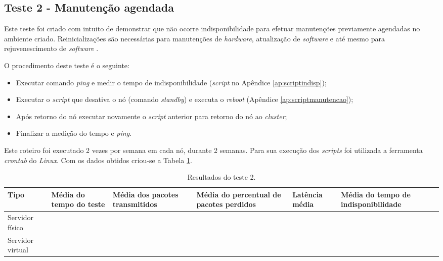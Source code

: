 \subsection{Teste 2 - Manutenção agendada}

Este teste foi criado com intuito de demonstrar que não ocorre indisponibilidade para efetuar manutenções previamente agendadas no ambiente criado.
Reinicializações são necessárias para manutenções de \textit{hardware}, atualização de \textit{software} e até mesmo para rejuvenescimento de
\textit{software} \cite{melo2014}.

O procedimento deste teste é o seguinte:
\begin{itemize}
 \item Executar comando \textit{ping} e medir o tempo de indisponibilidade (\textit{script} no Apêndice \ref{ap:scriptindisp});
 \item Executar o \textit{script} que desativa o nó (comando \textit{standby}) e executa o \textit{reboot} (Apêndice \ref{ap:scriptmanutencao});
 \item Após retorno do nó executar novamente o \textit{script} anterior para retorno do nó ao \textit{cluster};
 \item Finalizar a medição do tempo e \textit{ping}.
\end{itemize}

Este roteiro foi executado 2 vezes por semana em cada nó, durante 2 semanas. Para sua execução dos \textit{scripts} foi utilizada a ferramenta 
\textit{crontab} do \textit{Linux}. Com os dados obtidos criou-se a Tabela \ref{tab:teste2resultados}.

\begin{table}[h!]
\caption{Resultados do teste 2.}
\label{tab:teste2resultados}
\begin{center}
\begin{tabular}{|l|p{2.5cm}|p{2.5cm}|p{2.5cm}|p{2.5cm}|p{3cm}|}\hline
\textbf{Tipo} & \textbf{Média do tempo do teste} & \textbf{Média dos pacotes transmitidos} & \textbf{Média do percentual de pacotes perdidos} & \textbf{Latência média} & \textbf{Média do tempo de indisponibilidade} \\\hline
Servidor físico & & & & & \\\hline
Servidor virtual & & & & & \\\hline
\end{tabular}
\end{center}
\end{table}

